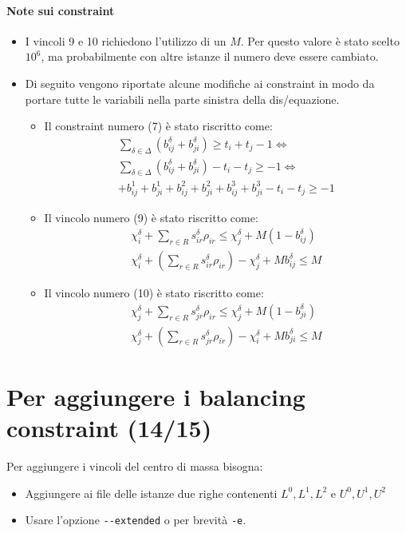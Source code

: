 \documentclass{scrartcl}
\begin{document}
\paragraph{Note sui constraint}
\begin{itemize}
	\item I vincoli 9 e 10 richiedono l'utilizzo di un $M$. Per questo
	valore è stato scelto $10^6$, ma probabilmente con altre istanze il numero deve essere cambiato.
	
	\item Di seguito vengono riportate alcune modifiche ai constraint in modo da portare
	tutte le variabili nella parte sinistra della dis/equazione.
	\begin{itemize}
	\item 
	Il constraint numero (7) è stato riscritto come:
	$$
	\begin{array}{l}
	\sum_{\delta \in \Delta}(b_{ij}^\delta + b_{ji}^\delta) \geq t_i + t_j - 1 \iff \\
	\sum_{\delta \in \Delta}(b_{ij}^\delta + b_{ji}^\delta) - t_i - t_j \geq - 1 \iff \\
	+ b_{ij}^1 + b_{ji}^1 + b_{ij}^2 + b_{ji}^2 + b_{ij}^3 + b_{ji}^3 - t_i - t_j \geq  -1
	\end{array}
	$$
	\item 
	Il vincolo numero (9) è stato riscritto come:
	$$
	\begin{array}{l}
	\chi_i^\delta + \sum_{r \in R} s_{ir}^\delta \rho_{ir} \leq \chi_j^\delta + M(1 - b_{ij}^\delta)\\
	\chi_i^\delta + (\sum_{r \in R} s_{ir}^\delta \rho_{ir}) -  \chi_j^\delta + M b_{ij}^\delta \leq M
	\end{array}
	$$
	\item 
	Il vincolo numero (10) è stato riscritto come:
	$$
	\begin{array}{l}
	\chi_j^\delta + \sum_{r \in R} s_{jr}^\delta \rho_{ir} \leq \chi_j^\delta + M(1 - b_{ji}^\delta)\\
	\chi_j^\delta + (\sum_{r \in R} s_{jr}^\delta \rho_{ir}) -  \chi_i^\delta + M b_{ji}^\delta \leq M
	\end{array}
	$$
\end{itemize}
\end{itemize}
\section{Per aggiungere i balancing constraint (14/15)}
Per aggiungere i vincoli del centro di massa bisogna:
\begin{itemize}
	\item Aggiungere ai file delle istanze due righe contenenti $L^0, L^1, L^2$ e $U^0, U^1, U^2$
	\item Usare l'opzione \verb|--extended| o per brevità \verb|-e|.
\end{itemize}
\end{document}

